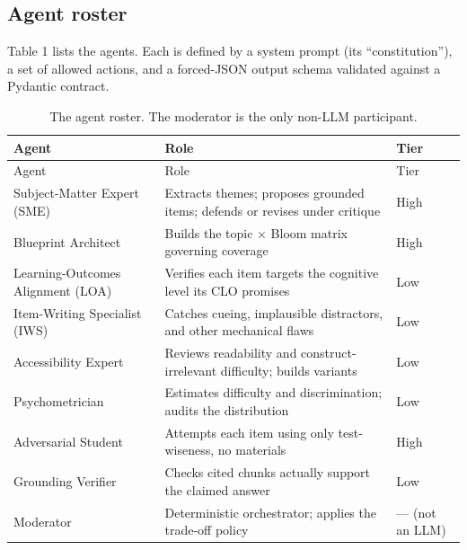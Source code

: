 \documentclass[
  11pt,
  letterpaper,
]{article}
\begin{document}
\subsection{Agent roster}\label{agent-roster}

Table 1 lists the agents. Each is defined by a system prompt (its
``constitution''), a set of allowed actions, and a forced-JSON output
schema validated against a Pydantic contract.

\begin{longtable}[]{@{}
  >{\raggedright\arraybackslash}p{}
  >{\raggedright\arraybackslash}p{}
  >{\raggedright\arraybackslash}p{}@{}}
\caption{The agent roster. The moderator is the only non-LLM
participant.}\label{tbl-roster}\tabularnewline
\toprule\noalign{}
\begin{minipage}[b]{\linewidth}\raggedright
Agent
\end{minipage} & \begin{minipage}[b]{\linewidth}\raggedright
Role
\end{minipage} & \begin{minipage}[b]{\linewidth}\raggedright
Tier
\end{minipage} \\
\midrule\noalign{}
\endfirsthead
\toprule\noalign{}
\begin{minipage}[b]{\linewidth}\raggedright
Agent
\end{minipage} & \begin{minipage}[b]{\linewidth}\raggedright
Role
\end{minipage} & \begin{minipage}[b]{\linewidth}\raggedright
Tier
\end{minipage} \\
\midrule\noalign{}
\endhead
\bottomrule\noalign{}
\endlastfoot
Subject-Matter Expert (SME) & Extracts themes; proposes grounded items;
defends or revises under critique & High \\
Blueprint Architect & Builds the topic × Bloom matrix governing coverage
& High \\
Learning-Outcomes Alignment (LOA) & Verifies each item targets the
cognitive level its CLO promises & Low \\
Item-Writing Specialist (IWS) & Catches cueing, implausible distractors,
and other mechanical flaws & Low \\
Accessibility Expert & Reviews readability and construct-irrelevant
difficulty; builds variants & Low \\
Psychometrician & Estimates difficulty and discrimination; audits the
distribution & Low \\
Adversarial Student & Attempts each item using only test-wiseness, no
materials & High \\
Grounding Verifier & Checks cited chunks actually support the claimed
answer & Low \\
Moderator & Deterministic orchestrator; applies the trade-off policy &
--- (not an LLM) \\
\end{longtable}
\end{document}
